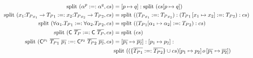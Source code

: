 \documentclass[10pt,a4paper]{article}
\begin{document}
\begin{align*}
 \text{split}\ ({\alpha ^{p} :=: \alpha ^{q}} , cs)  &=  \left[ p \mapsto q \right] : \text{split}\ (cs{ \left[ p \mapsto q \right] }) \\
 \text{split}\ ({{x_1}\text{:}{\ensuremath{{T_P}}_{x_1}} \rightarrow {\ensuremath{{T_P}}_1} :=: {x_2}\text{:}{\ensuremath{{T_P}}_{x_2}} \rightarrow {\ensuremath{{T_P}}_2}} , cs)  &= 
	 \text{split}\ (({T_P}_{x_1}:=:{T_P}_{x_2}):({T_P}_1 \left[ x_1 \mapsto x_2 \right]  :=: {T_P}_2):cs) \\
 \text{split}\ ({\forall \alpha_1 . {T_P}_1 :=: \forall \alpha_2 . {T_P}_2} , cs)  
	&=  \text{split}\ (({T_P}_1{ \left[ \alpha_1 \mapsto \alpha_2 \right] } :=: {T_P}_2):cs) \\
 \text{split}\ ({\mathsf{\mathsf{C}} \ \overline{{T_P}} :=: \mathsf{\mathsf{C}} \ \overline{{T_P}}} , cs)  
	&=  \text{split}\ (cs) \\
 \text{split}\ (	\mathsf{\mathsf{C}} ^{p_1} \ \overline{{T_P}_1} \ \overline{p_1} :=: 
		 	\mathsf{\mathsf{C}} ^{p_2} \ \overline{{T_P}_2} \ \overline{p_2} , cs)  
	&=  \left[ \overline{p_1} \mapsto \overline{p_2} \right]  :  \left[ p_1 \mapsto p_2 \right] :\\
	& \text{split}\ ( (\{ \overline{{T_P}_1} :=: \overline{{T_P}_2} \} \cup cs) { \left[ p_1 \mapsto p_2 \right]  o  \left[ \overline{p_1} \mapsto \overline{p_2} \right] }) \\
\end{align*}
\end{document}
